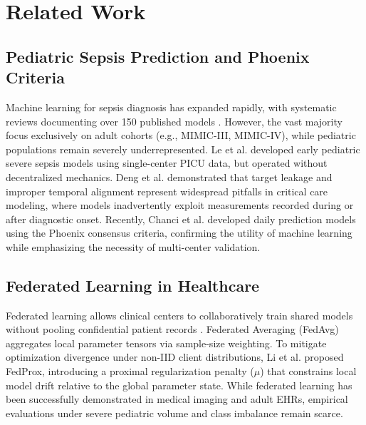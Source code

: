 \documentclass[runningheads]{llncs}
\begin{document}
\section{Related Work}\label{sec:litreview}

\subsection{Pediatric Sepsis Prediction and Phoenix Criteria}
Machine learning for sepsis diagnosis has expanded rapidly, with systematic reviews documenting over 150 published models \cite{fleuren2020ml,yang2023sepsis}. However, the vast majority focus exclusively on adult cohorts (e.g., MIMIC-III, MIMIC-IV), while pediatric populations remain severely underrepresented. Le et al. \cite{le2019pediatric} developed early pediatric severe sepsis models using single-center PICU data, but operated without decentralized mechanics. Deng et al. \cite{deng2022evaluating} demonstrated that target leakage and improper temporal alignment represent widespread pitfalls in critical care modeling, where models inadvertently exploit measurements recorded during or after diagnostic onset. Recently, Chanci et al. \cite{chanci2025machine} developed daily prediction models using the Phoenix consensus criteria, confirming the utility of machine learning while emphasizing the necessity of multi-center validation.

\subsection{Federated Learning in Healthcare}
Federated learning allows clinical centers to collaboratively train shared models without pooling confidential patient records \cite{mcmahan2017fedavg}. Federated Averaging (FedAvg) aggregates local parameter tensors via sample-size weighting. To mitigate optimization divergence under non-IID client distributions, Li et al. \cite{li2020fedprox} proposed FedProx, introducing a proximal regularization penalty ($\mu$) that constrains local model drift relative to the global parameter state. While federated learning has been successfully demonstrated in medical imaging and adult EHRs, empirical evaluations under severe pediatric volume and class imbalance remain scarce.
\end{document}
